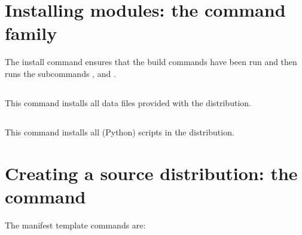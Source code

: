 \documentclass{manual}
\begin{document}


\section{Installing modules: the \protect{} command family}
\label{install-cmd}

The install command ensures that the build commands have been run and then
runs the subcommands ,
 and
.


\subsection{\protect{}}
\label{install-data-cmd}
This command installs all data files provided with the distribution.

\subsection{\protect{}}
\label{install-scripts-cmd}
This command installs all (Python) scripts in the distribution.




\section{Creating a source distribution: the
            \protect{} command}
\label{sdist-cmd}



The manifest template commands are:
\end{document}
